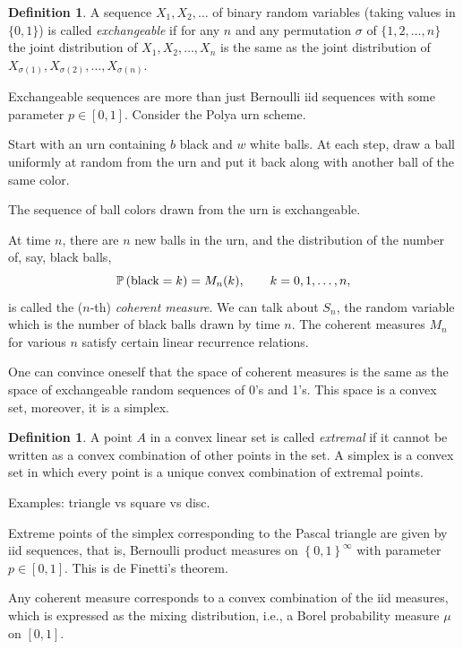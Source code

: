 \documentclass[letterpaper,11pt,oneside,reqno]{article}
\numberwithin{equation}{section}
\theoremstyle{definition}
\newtheorem{definition}[proposition]{Definition}
\begin{document}
\begin{definition}
	A sequence $X_1,X_2,\ldots $
	of binary random variables
	(taking values in $\{0,1\}$)
	is called \emph{exchangeable}
	if for any $n$ and any permutation $\sigma$ of $\{1,2,\ldots,n\}$ the joint distribution of $X_1,X_2,\ldots,X_n$ is the same as the joint distribution of $X_{\sigma(1)},X_{\sigma(2)},\ldots,X_{\sigma(n)}$.
\end{definition}

Exchangeable sequences are more than just Bernoulli iid sequences with some
parameter $p\in[0,1]$. Consider the Polya urn scheme.

Start with an urn containing $b$ black and $w$ white balls.
At each step, draw a ball uniformly at random from the urn
and put it back along with another ball of the same color.

The sequence of ball colors drawn from the urn is exchangeable.

At time $n$, there are $n$ new balls in the urn, and the distribution of the number of, say,
black balls,
\begin{equation*}
	\operatorname{\mathbb{P}}\left( \textnormal{black}=k \right) = M_n(k),
	\qquad k=0,1,\ldots,n,
\end{equation*}
is called the ($n$-th) \emph{coherent measure}.
We can talk about $S_n$, the random variable which is the number of black balls drawn by time $n$.
The coherent measures $M_n$ for various $n$ satisfy certain linear
recurrence relations.

One can convince oneself that the space of coherent measures is
the same as the space of exchangeable random sequences of 0's and 1's.
This space is a convex set, moreover, it is a simplex.

\begin{definition}
	A point $A$ in a convex linear set is called
	\emph{extremal} if it cannot be written as a convex combination of other points in the set.
	A simplex is a convex set in which every point is a unique
	convex combination of extremal points.

	Examples: triangle vs square vs disc.
\end{definition}

Extreme points of the simplex corresponding to the Pascal triangle
are given by iid sequences,
that is, Bernoulli product measures on $\left\{ 0,1 \right\}^\infty$ with
parameter $p\in[0,1]$.
This is de Finetti's theorem.

Any coherent measure corresponds to a convex combination of the iid measures,
which is expressed as the mixing distribution, i.e., a Borel
probability measure $\mu$ on $[0,1]$.
\end{document}
